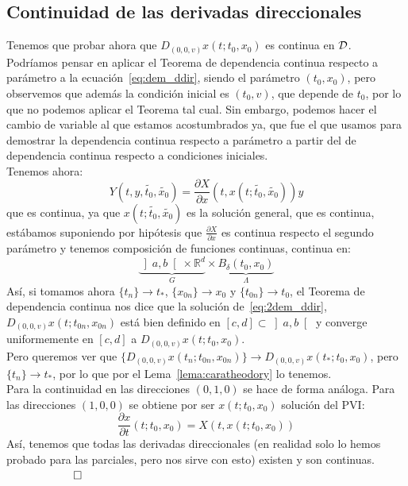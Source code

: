 \subsection{Continuidad de las derivadas direccionales}
\noindent
Tenemos que probar ahora que $D_{(0,0,v)}x(t;t_0,x_0)$ es continua en $\mathcal{D}$.\\

\noindent
Podríamos pensar en aplicar el Teorema de dependencia continua respecto a parámetro a la ecuación~\eqref{eq:dem_ddir}, siendo el parámetro $(t_0,x_0)$, pero observemos que además la condición inicial es $(t_0,v)$, que depende de $t_0$, por lo que no podemos aplicar el Teorema tal cual. Sin embargo, podemos hacer el cambio de variable al que estamos acostumbrados ya, que fue el que usamos para demostrar la dependencia continua respecto a parámetro a partir del de dependencia continua respecto a condiciones iniciales.\\

\noindent
Tenemos ahora:
\begin{equation}\label{eq:2dem_ddir}
    Y\left(t,y,\tilde{t_0},\tilde{x_0}\right) = \frac{\partial X}{\partial x}\left(t,x\left(t;\tilde{t_0},\tilde{x_0}\right)\right)y
\end{equation}
que es continua, ya que $x\left(t;\tilde{t_0},\tilde{x_0}\right)$ es la solución general, que es continua, estábamos suponiendo por hipótesis que $\frac{\partial X}{\partial x}$ es continua respecto el segundo parámetro y tenemos composición de funciones continuas, continua en:
\begin{equation*}
    \underbrace{\left]a,b\right[\times \mathbb{R}^d}_G\times \underbrace{B_\delta(t_0,x_0)}_\Lambda
\end{equation*}
Así, si tomamos ahora $\{t_n\}\to t_\ast$, $\{x_{0n}\}\to x_0$ y $\{t_{0n}\}\to t_0$, el Teorema de dependencia continua nos dice que la solución de~\eqref{eq:2dem_ddir}, $D_{(0,0,v)}x(t;t_{0n},x_{0n})$ está bien definido en $[c,d]\subset \left]a,b\right[$ y converge uniformemente en $[c,d]$ a $D_{(0,0,v)}x(t;t_0,x_0)$.\\

\noindent
Pero queremos ver que $\{D_{(0,0,v)}x(t_n;t_{0n},x_{0n})\}\to D_{(0,0,v)}x(t_\ast;t_0,x_0)$, pero $\{t_n\}\to t_\ast$, por lo que por el Lema~\ref{lema:caratheodory} lo tenemos.\\

\noindent
Para la continuidad en las direcciones $(0,1,0)$ se hace de forma análoga. Para las direcciones $(1,0,0)$ se obtiene por ser $x(t;t_0,x_0)$ solución del PVI:
\begin{equation*}
    \frac{\partial x}{\partial t}(t;t_0,x_0) = X(t,x(t;t_0,x_0))
\end{equation*}
Así, tenemos que todas las derivadas direccionales (en realidad solo lo hemos probado para las parciales, pero nos sirve con esto) existen y son continuas. $\qquad\qquad  \qed$\\


